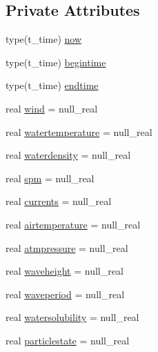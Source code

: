 \subsection*{Private Attributes}
\begin{DoxyCompactItemize}
\item 
type(t\+\_\+time) \mbox{\hyperlink{structmodulehns_1_1t__external_a2c387536655c509a2b4ec1635a579534}{now}}
\item 
type(t\+\_\+time) \mbox{\hyperlink{structmodulehns_1_1t__external_ab28e601f70c7989856c3f050b1f5b5a6}{begintime}}
\item 
type(t\+\_\+time) \mbox{\hyperlink{structmodulehns_1_1t__external_ac0e3b651d40c523222302a9a7ea914ff}{endtime}}
\item 
real \mbox{\hyperlink{structmodulehns_1_1t__external_a60ce29cebae416094600cb1e31776ced}{wind}} = null\+\_\+real
\item 
real \mbox{\hyperlink{structmodulehns_1_1t__external_a7fb82d2f5478edee4d88d24340d7a49e}{watertemperature}} = null\+\_\+real
\item 
real \mbox{\hyperlink{structmodulehns_1_1t__external_aad717d175ff397331dbcf0fd46ddef8c}{waterdensity}} = null\+\_\+real
\item 
real \mbox{\hyperlink{structmodulehns_1_1t__external_a33e530fe7026604b178fffd4356ea508}{spm}} = null\+\_\+real
\item 
real \mbox{\hyperlink{structmodulehns_1_1t__external_aae1ae0af59a7ba19a73d441656150662}{currents}} = null\+\_\+real
\item 
real \mbox{\hyperlink{structmodulehns_1_1t__external_ae4f4220aca7e87582a515af8cb172aae}{airtemperature}} = null\+\_\+real
\item 
real \mbox{\hyperlink{structmodulehns_1_1t__external_afc612a36e3e9fc32f726396511f756e1}{atmpressure}} = null\+\_\+real
\item 
real \mbox{\hyperlink{structmodulehns_1_1t__external_a2e9155b57931edbede4ed933e4e82391}{waveheight}} = null\+\_\+real
\item 
real \mbox{\hyperlink{structmodulehns_1_1t__external_a228ba2568a0acf3349f7b4897766d827}{waveperiod}} = null\+\_\+real
\item 
real \mbox{\hyperlink{structmodulehns_1_1t__external_a8cffbaa921d91818d09fc8def812d42f}{watersolubility}} = null\+\_\+real
\item 
real \mbox{\hyperlink{structmodulehns_1_1t__external_a453e4cd30df046fb89742641e2b1e7dc}{particlestate}} = null\+\_\+real
\item 

\end{DoxyCompactItemize}
